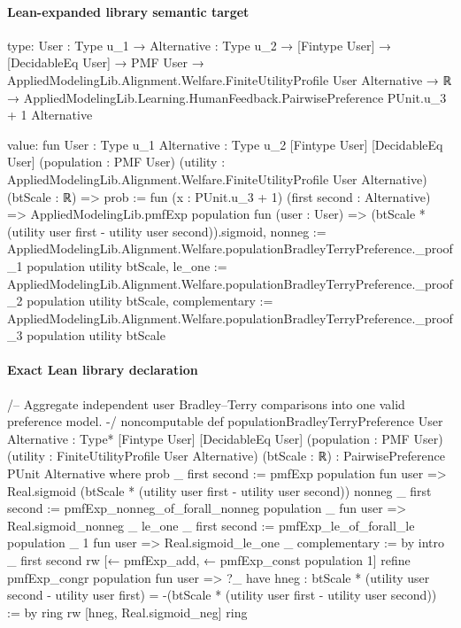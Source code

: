 \documentclass[10pt]{article}
\begin{document}
\paragraph{Lean-expanded library semantic target}
\begin{ReviewVerbatim}
type:
{User : Type u_1} →
  {Alternative : Type u_2} →
    [Fintype User] →
      [DecidableEq User] →
        PMF User →
          AppliedModelingLib.Alignment.Welfare.FiniteUtilityProfile User Alternative →
            ℝ → AppliedModelingLib.Learning.HumanFeedback.PairwisePreference PUnit.{u_3 + 1} Alternative

value:
fun {User : Type u_1} {Alternative : Type u_2} [Fintype User] [DecidableEq User] (population : PMF User)
    (utility : AppliedModelingLib.Alignment.Welfare.FiniteUtilityProfile User Alternative) (btScale : ℝ) =>
  {
    prob := fun (x : PUnit.{u_3 + 1}) (first second : Alternative) =>
      AppliedModelingLib.pmfExp population fun (user : User) =>
        (btScale * (utility user first - utility user second)).sigmoid,
    nonneg := AppliedModelingLib.Alignment.Welfare.populationBradleyTerryPreference._proof_1 population utility btScale,
    le_one := AppliedModelingLib.Alignment.Welfare.populationBradleyTerryPreference._proof_2 population utility btScale,
    complementary :=
      AppliedModelingLib.Alignment.Welfare.populationBradleyTerryPreference._proof_3 population utility btScale }
\end{ReviewVerbatim}

\paragraph{Exact Lean library declaration}
\begin{ReviewVerbatim}
/-- Aggregate independent user Bradley--Terry comparisons into one valid preference model. -/
noncomputable def populationBradleyTerryPreference
    {User Alternative : Type*} [Fintype User] [DecidableEq User]
    (population : PMF User) (utility : FiniteUtilityProfile User Alternative)
    (btScale : ℝ) : PairwisePreference PUnit Alternative where
  prob _ first second :=
    pmfExp population fun user =>
      Real.sigmoid (btScale * (utility user first - utility user second))
  nonneg _ first second :=
    pmfExp_nonneg_of_forall_nonneg population _ fun user => Real.sigmoid_nonneg _
  le_one _ first second :=
    pmfExp_le_of_forall_le population _ 1 fun user => Real.sigmoid_le_one _
  complementary := by
    intro _ first second
    rw [← pmfExp_add, ← pmfExp_const population 1]
    refine pmfExp_congr population fun user => ?_
    have hneg : btScale * (utility user second - utility user first) =
        -(btScale * (utility user first - utility user second)) := by ring
    rw [hneg, Real.sigmoid_neg]
    ring
\end{ReviewVerbatim}
\end{document}

